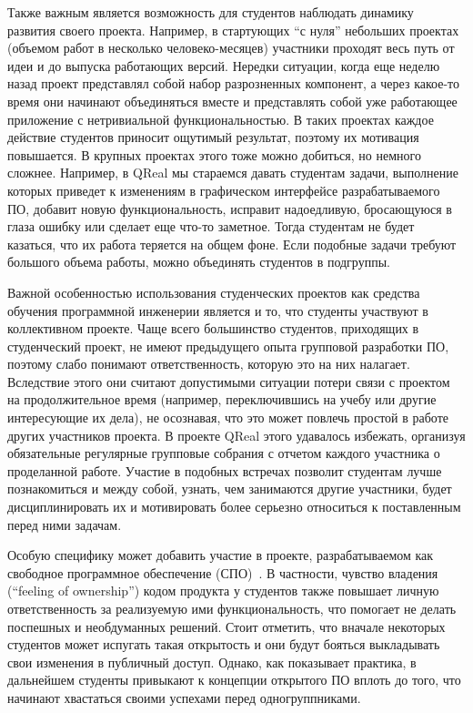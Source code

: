 \documentclass[a4paper]{article}
\begin{document}
Также важным является возможность для студентов наблюдать динамику развития своего проекта. Например, в стартующих ``с нуля'' небольших проектах (объемом работ в несколько человеко-месяцев) участники проходят весь путь от идеи и до выпуска работающих версий. Нередки ситуации, когда еще неделю назад проект представлял собой набор разрозненных компонент, а через какое-то время они начинают объединяться вместе и представлять собой уже работающее приложение с нетривиальной функциональностью. В таких проектах каждое действие студентов приносит ощутимый результат, поэтому их мотивация повышается. В крупных проектах этого тоже можно добиться, но немного сложнее. Например, в QReal мы стараемся давать студентам задачи, выполнение которых приведет к изменениям в графическом интерфейсе разрабатываемого ПО, добавит новую функциональность, исправит надоедливую, бросающуюся в глаза ошибку или сделает еще что-то заметное. Тогда студентам не будет казаться, что их работа теряется на общем фоне. Если подобные задачи требуют большого объема работы, можно объединять студентов в подгруппы.

Важной особенностью использования студенческих проектов как средства обучения программной инженерии является и то, что студенты участвуют в коллективном проекте. Чаще всего большинство студентов, приходящих в студенческий проект, не имеют предыдущего опыта групповой разработки ПО, поэтому слабо понимают ответственность, которую это на них налагает. Вследствие этого они считают допустимыми ситуации потери связи с проектом на продолжительное время (например, переключившись на учебу или другие интересующие их дела), не осознавая, что это может повлечь простой в работе других участников проекта. В проекте QReal этого удавалось избежать, организуя обязательные регулярные групповые собрания с отчетом каждого участника о проделанной работе. Участие в подобных встречах позволит студентам лучше познакомиться и между собой, узнать, чем занимаются другие участники, будет дисциплинировать их и мотивировать более серьезно относиться к поставленным перед ними задачам.

Особую специфику может добавить участие в проекте, разрабатываемом как свободное программное обеспечение (СПО)~\cite{saratov}. В частности, чувство владения (``feeling of ownership'') кодом продукта у студентов также повышает личную ответственность за реализуемую ими функциональность, что помогает не делать поспешных и необдуманных решений. Стоит отметить, что вначале некоторых студентов может испугать такая открытость и они будут бояться выкладывать свои изменения в публичный доступ. Однако, как показывает практика, в дальнейшем студенты привыкают к концепции открытого ПО вплоть до того, что начинают хвастаться своими успехами перед одногруппниками.
\end{document}
